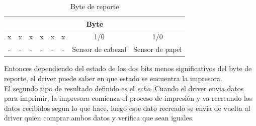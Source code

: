 \begin{table}[ht]
\centering
\begin{tabular}{|c|c|c|c|c|c|c|c|}									\hline
\multicolumn{8}{|c|}{Byte}										\\	\hline
x & x & x & x & x & x & 1/0 & 1/0 								\\ 	\hline
- & - & - & - & - & - & Sensor de cabezal & Sensor de papel		\\	\hline
\end{tabular}
\caption{Byte de reporte} 
\label{tab:report_byte}
\end{table}

Entonces dependiendo del estado de los dos bits menos significativos del byte
de reporte, el driver puede saber en que estado se encuentra la impresora.\\

El segundo tipo de resultado definido es el \emph{echo}. Cuando el driver
envia datos para imprimir, la impresora comienza el proceso de impresi\'on y
va recreando los datos recibidos segun lo que hace, luego este dato recreado
se envia de vuelta al driver quien comprar ambos datos y verifica que sean
iguales.



